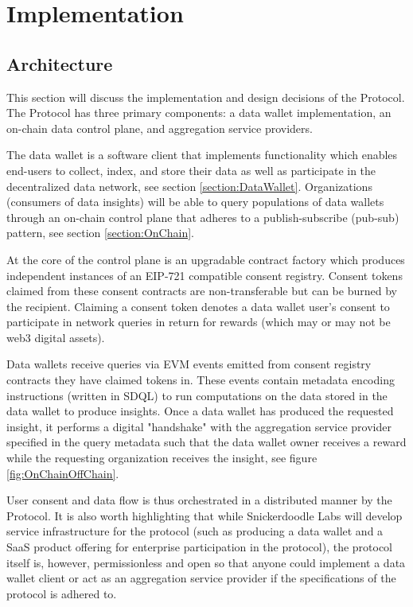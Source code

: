 \section{Implementation}
\label{section:Implementation}
\subsection{Architecture}
\label{section:Architecture}

This section will discuss the implementation and design decisions of the Protocol. The Protocol has three primary 
components: a data wallet implementation, an on-chain data control plane, and aggregation service providers.

The data wallet is a software client that implements functionality which enables end-users to collect, index, and store their data as well as participate 
in the decentralized data network, see section \ref{section:DataWallet}. Organizations (consumers of data insights) will be able 
to query populations of data wallets through an on-chain control plane that adheres to a publish-subscribe (pub-sub) pattern, see section \ref{section:OnChain}. 

At the core of the control plane is an upgradable contract factory which produces independent instances of an EIP-721 compatible consent registry. 
Consent tokens claimed from these consent contracts are non-transferable but can be burned by the recipient. Claiming a consent token denotes a data 
wallet user's consent to participate in network queries in return for rewards (which may or may not be web3 digital assets). 

Data wallets receive queries via EVM events emitted from consent registry contracts they have claimed tokens in. These events contain metadata encoding
instructions (written in SDQL) to run computations on the data stored in the data wallet to produce insights. Once a data wallet has produced
the requested insight, it performs a digital "handshake" with the aggregation service provider specified in the query metadata such that the 
data wallet owner receives a reward while the requesting organization receives the insight, see figure \ref{fig:OnChainOffChain}. 

User consent and data flow is thus orchestrated in a distributed manner by the Protocol. It is also worth highlighting that while 
Snickerdoodle Labs will develop service infrastructure for the protocol (such as producing a data wallet and a SaaS product offering 
for enterprise participation in the protocol), the protocol itself is, however, permissionless and open so that anyone could implement a 
data wallet client or act as an aggregation service provider if the specifications of the protocol is adhered to. 
